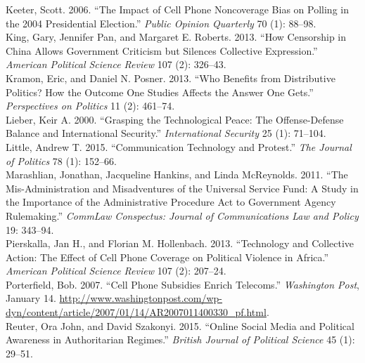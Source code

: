 \documentclass[12pt]{article}
\begin{document}
	\hspace*{-1cm}Keeter, Scott. 2006. “The Impact of Cell Phone Noncoverage Bias on Polling in the 2004 Presidential Election.” \textit{Public Opinion Quarterly} 70 (1): 88--98.\\
	\hspace*{-1cm}King, Gary, Jennifer Pan, and Margaret E. Roberts. 2013. “How Censorship in China Allows Government Criticism but Silences Collective Expression.” \textit{American Political Science Review} 107 (2): 326--43. \\
	\hspace*{-1cm}Kramon, Eric, and Daniel N. Posner. 2013. “Who Benefits from Distributive Politics? How the Outcome One Studies Affects the Answer One Gets.” \textit{Perspectives on Politics} 11 (2): 461–74.\\
	\hspace*{-1cm}Lieber, Keir A. 2000. “Grasping the Technological Peace: The Offense-Defense Balance and International Security.” \textit{International Security }25 (1): 71--104.\\
	\hspace*{-1cm}Little, Andrew T. 2015. “Communication Technology and Protest.” \textit{The Journal of Politics} 78 (1): 152--66.\\
	\hspace*{-1cm}Marashlian, Jonathan, Jacqueline Hankins, and Linda McReynolds. 2011. “The Mis-Administration and Misadventures of the Universal Service Fund: A Study in the Importance of the Administrative Procedure Act to Government Agency Rulemaking.” \textit{CommLaw Conspectus: Journal of Communications Law and Policy} 19: 343--94.\\
	\hspace*{-1cm}Pierskalla, Jan H., and Florian M. Hollenbach. 2013. “Technology and Collective Action: The Effect of Cell Phone Coverage on Political Violence in Africa.” \textit{American Political Science Review }107 (2): 207--24.\\
	\hspace*{-1cm}Porterfield, Bob. 2007. “Cell Phone Subsidies Enrich Telecoms.” \textit{Washington Post}, January 14. \url{http://www.washingtonpost.com/wp-dyn/content/article/2007/01/14/AR2007011400330\_pf.html}.\\
	\hspace*{-1cm}Reuter, Ora John, and David Szakonyi. 2015. “Online Social Media and Political Awareness in Authoritarian Regimes.” \textit{British Journal of Political Science} 45 (1): 29--51. \\
\end{document}
